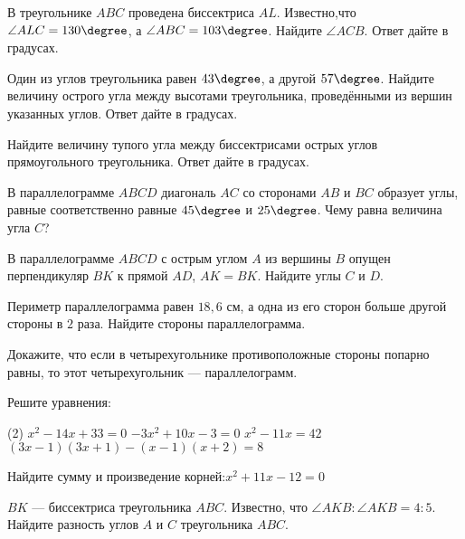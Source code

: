 %
%
\begin{homework}[number=3]
	\begin{listofex}
		\item В треугольнике \( ABC \) проведена биссектриса \( AL \). Известно,что \( \angle ALC=130\degree \),
		а \( \angle ABC =103\degree \).
		Найдите \( \angle ACB \).
		Ответ дайте в градусах.
		\item Один из углов треугольника равен \( 43\degree \), а другой \( 57\degree \).
		Найдите величину острого угла между высотами треугольника,
		проведёнными из вершин указанных углов.
		Ответ дайте в градусах.
		\item Найдите величину тупого угла между биссектрисами острых
		углов прямоугольного треугольника. Ответ дайте в градусах.
	\end{listofex}
\end{homework}
%	
%

%
%
\begin{exam}
	\begin{listofex}
		\item В параллелограмме  \(ABCD\) диагональ \(AC\) со сторонами \(AB\) и \(BC\) образует углы, равные соответственно равные \(45\degree\) и \(25\degree\). Чему равна величина угла \( C \)?
		\item В параллелограмме \(ABCD\)  с острым углом \(A\) из вершины \(B\) опущен перпендикуляр \(BK\) к прямой \(AD\), \(AK=BK\). Найдите углы \(C\) и \(D\).
		\item Периметр параллелограмма равен \( 18,6 \) см, а одна из его сторон больше другой стороны в \( 2 \)  раза. Найдите стороны параллелограмма.
		\item Докажите, что если в четырехугольнике противоположные стороны попарно равны, то этот четырехугольник --- параллелограмм. 
		\item Решите уравнения:
		\begin{tasks}(2)
			\task \(x^2-14x+33=0\)
			\task \(-3x^2+10x-3=0\)
			\task \(x^2-11x=42\)
			\task \((3x-1)(3x+1)-(x-1)(x+2)=8\)
		\end{tasks}
		\item Найдите сумму и произведение корней:\quad\(x^2+11x-12=0\)
		\item \( BK \) --- биссектриса треугольника \( ABC \). Известно,
		что \( \angle AKB : \angle AKB = 4 : 5 \).
		Найдите разность углов \( A \) и \( C \) треугольника \( ABC \).
	\end{listofex}
\end{exam}
